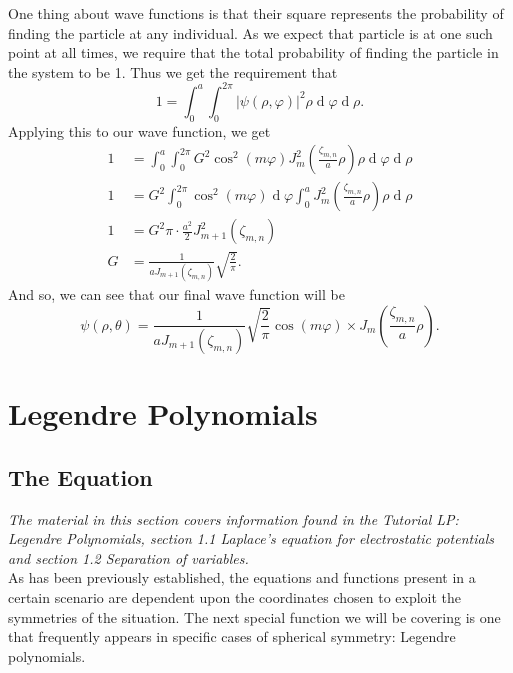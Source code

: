 \documentclass[11pt]{report}
\newcommand{\fpar}[1]{\left({#1}\right)}
\newcommand{\fabs}[1]{\left|{#1}\right|}
\renewcommand{\d}[1]{\ensuremath{\operatorname{d}\!{#1}}}
\begin{document}
One thing about wave functions is that their square represents the probability of finding the particle at any individual. As we expect that particle is at one such point at all times, we require that the total probability of finding the particle in the system to be 1. Thus we get the requirement that 
    \begin{equation*}
        1 = \int_{0}^a\int_{0}^{2\pi}\fabs{\psi\fpar{\rho,\varphi}}^2\rho\d\varphi\d\rho.
    \end{equation*}
Applying this to our wave function, we get
    \begin{align*}
         1 &= \int_{0}^a\int_{0}^{2\pi}G^2\cos^2\fpar{m\varphi}J_m^2\fpar{\frac{\zeta_{m,n}}{a}\rho}\rho\d\varphi\d\rho\\
         1 &= G^2\int_{0}^{2\pi}\cos^2\fpar{m\varphi}\d\varphi\int_{0}^aJ_m^2\fpar{\frac{\zeta_{m,n}}{a}\rho}\rho\d\rho\\
         1 &= G^2\pi\cdot\frac{a^2}{2}J_{m+1}^2\fpar{\zeta_{m,n}}\\
         G &= \frac{1}{aJ_{m+1}\fpar{\zeta_{m,n}}}\sqrt{\frac{2}{\pi}}.
    \end{align*}
And so, we can see that our final wave function will be
    \begin{equation*}
        \psi\fpar{\rho,\theta} =  \frac{1}{aJ_{m+1}\fpar{\zeta_{m,n}}}\sqrt{\frac{2}{\pi}}\cos\fpar{m\varphi
        }\times J_m\fpar{\frac{\zeta_{m,n}}{a}\rho}.
    \end{equation*}
     
    

\chapter{Legendre Polynomials}




\section{The Equation}

\emph{The material in this section covers information found in the Tutorial LP: Legendre Polynomials, section 1.1 Laplace’s equation for electrostatic potentials and section 1.2 Separation of variables.}\\

As has been previously established, the equations and functions present in a certain
scenario are dependent upon the coordinates chosen to exploit the symmetries of the situation. The next special function we will be covering is one that frequently appears in specific cases of spherical symmetry: Legendre polynomials.\\
\end{document}
